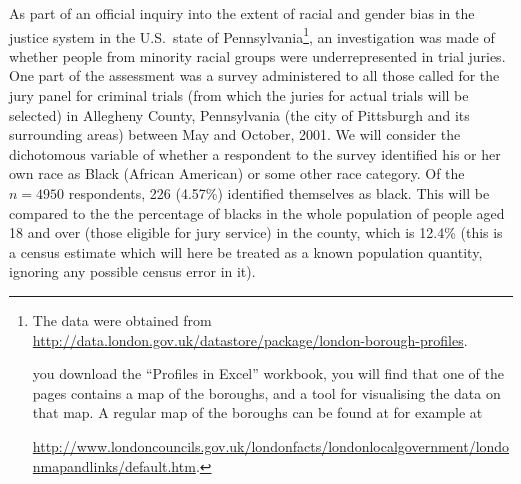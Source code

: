 \documentclass[11pt,a4paper,openany]{book}
\let\rmarkdownfootnote\footnote%
\def\footnote{\protect\rmarkdownfootnote}
\begin{document}
As part of an official inquiry into the extent of racial and gender bias
in the justice system in the U.S.~state of Pennsylvania\footnote{The
  data were obtained from
  \url{http://data.london.gov.uk/datastore/package/london-borough-profiles}.

  \noindentIf you download the ``Profiles in Excel'' workbook, you will
  find that one of the pages contains a map of the boroughs, and a tool
  for visualising the data on that map. A regular map of the boroughs
  can be found at for example at

  \url{http://www.londoncouncils.gov.uk/londonfacts/londonlocalgovernment/londonmapandlinks/default.htm}.},
an investigation was made of whether people from minority racial groups
were underrepresented in trial juries. One part of the assessment was a
survey administered to all those called for the jury panel for criminal
trials (from which the juries for actual trials will be selected) in
Allegheny County, Pennsylvania (the city of Pittsburgh and its
surrounding areas) between May and October, 2001. We will consider the
dichotomous variable of whether a respondent to the survey identified
his or her own race as Black (African American) or some other race
category. Of the \(n=4950\) respondents, 226 (4.57\%) identified
themselves as black. This will be compared to the the percentage of
blacks in the whole population of people aged 18 and over (those
eligible for jury service) in the county, which is 12.4\% (this is a
census estimate which will here be treated as a known population
quantity, ignoring any possible census error in it).
\end{document}

